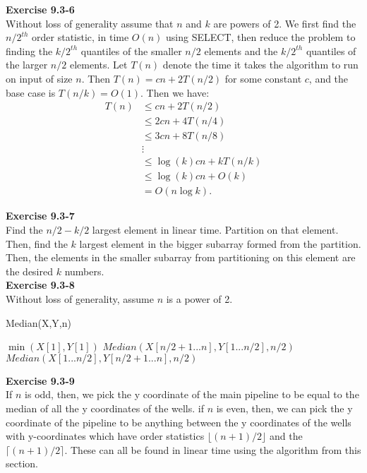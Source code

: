 \documentclass{article}
\begin{document}
\noindent\textbf{Exercise 9.3-6}\\

Without loss of generality assume that $n$ and $k$ are powers of 2. We first find the $n/2^{th}$ order statistic, in time $O(n)$ using SELECT, then reduce the problem to finding the $k/2^{th}$ quantiles of the smaller $n/2$ elements and the $k/2^{th}$ quantiles of the larger $n/2$ elements.  Let $T(n)$ denote the time it takes the algorithm to run on input of size $n$.  Then $T(n) = cn+ 2T(n/2)$ for some constant $c$, and the base case is $T(n/k) = O(1)$.  Then we have:
\begin{align*}
T(n) &\leq cn+2T(n/2) \\
&\leq 2cn + 4T(n/4) \\
&\leq 3cn + 8T(n/8) \\
&\vdots \\
& \leq \log(k)cn + kT(n/k) \\
&\leq \log(k)cn + O(k) \\
&= O(n \log k).
\end{align*}


\noindent\textbf{ Exercise 9.3-7} \\
Find the $n/2-k/2$ largest element in linear time. Partition on that element. Then, find the $k$ largest element in the bigger subarray formed from the partition. Then, the elements in the smaller subarray from partitioning on this element are the desired $k$ numbers.\\

\noindent\textbf{Exercise 9.3-8}\\
Without loss of generality, assume $n$ is a power of 2. 

\begin{algorithm}
\caption{Median(X,Y,n)}
\begin{algorithmic}
	\State \Return $\min(X[1], Y[1])$
\EndIf
{}
	\State \Return $Median(X[ n/2 + 1 ...n], Y[1...n/2],n/2)$
\Else {}
	\State \Return $Median(X[1...n/2], Y[n/2+1...n], n/2)$
\EndIf
\EndIf
\end{algorithmic}
\end{algorithm}

\noindent\textbf{ Exercise 9.3-9} \\
If $n$ is odd, then, we pick the y coordinate of the main pipeline to be equal to the median of all the y coordinates of the wells. if $n$ is even, then, we can pick the y coordinate of the pipeline to be anything between the y coordinates of the wells with y-coordinates which have order statistics $\lfloor (n+1)/2\rfloor$ and the $\lceil (n+1)/2 \rceil$. These can all be found in linear time using the algorithm from this section.\\
\end{document}

